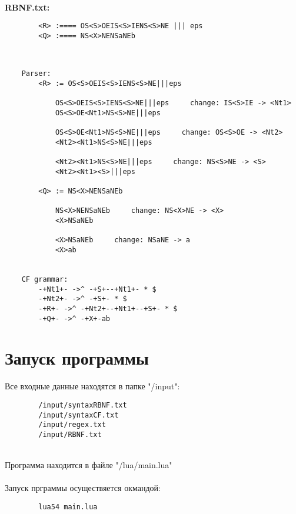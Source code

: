 \documentclass[12pt]{article}
\begin{document}
    \hfill \\
    {\bfseries RBNF.txt:}
    \begin{lstlisting}
        <R> :==== OS<S>OEIS<S>IENS<S>NE ||| eps
        <Q> :==== NS<X>NENSaNEb
    \end{lstlisting}

    \hfill \\
    \begin{lstlisting}
    Parser:
        <R> := OS<S>OEIS<S>IENS<S>NE|||eps

            OS<S>OEIS<S>IENS<S>NE|||eps     change: IS<S>IE -> <Nt1>
            OS<S>OE<Nt1>NS<S>NE|||eps

            OS<S>OE<Nt1>NS<S>NE|||eps     change: OS<S>OE -> <Nt2>
            <Nt2><Nt1>NS<S>NE|||eps

            <Nt2><Nt1>NS<S>NE|||eps     change: NS<S>NE -> <S>
            <Nt2><Nt1><S>|||eps

        <Q> := NS<X>NENSaNEb

            NS<X>NENSaNEb     change: NS<X>NE -> <X>
            <X>NSaNEb

            <X>NSaNEb     change: NSaNE -> a
            <X>ab


    CF grammar:
        -+Nt1+- ->^ -+S+--+Nt1+- * $
        -+Nt2+- ->^ -+S+- * $
        -+R+- ->^ -+Nt2+--+Nt1+--+S+- * $
        -+Q+- ->^ -+X+-ab

    \end{lstlisting}

    \clearpage


    \section{Запуск программы}

    Все входные данные находятся в папке "/input":
    \begin{lstlisting}
        /input/syntaxRBNF.txt
        /input/syntaxCF.txt
        /input/regex.txt
        /input/RBNF.txt
    \end{lstlisting}

    \hfill \\
    Программа находится в файле "/lua/main.lua"\\
    \hfill \\
    Запуск прграммы осуществяется окмандой:
    \begin{lstlisting}
        lua54 main.lua
    \end{lstlisting}
\end{document}
